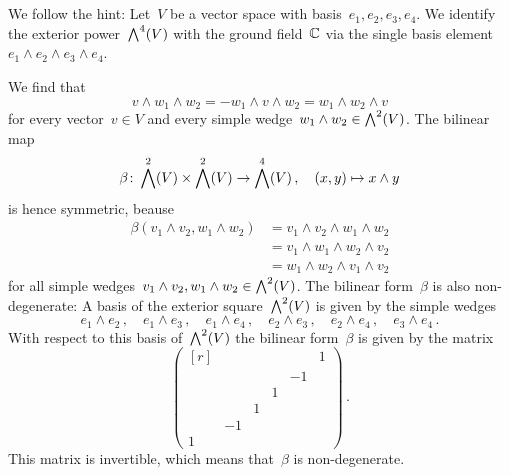 \section{}





\addtocounter{subsection}{1}





\addtocounter{subsection}{1}





\subsection{}

We follow the hint:
Let~$V$ be a {\fourdimensional} vector space with basis~$e_1, e_2, e_3, e_4$.
We identify the exterior power~$\exterior[4]{V}$ with the ground field~$\mathbb{C}$ via the single basis element~$e_1 \wedge e_2 \wedge e_3 \wedge e_4$.

We find that
\[
  v \wedge w_1 \wedge w_2
  =
  - w_1 \wedge v \wedge w_2
  =
  w_1 \wedge w_2 \wedge v
\]
for every vector~$v \in V$ and every simple wedge~$w_1 \wedge w_2 \in \exterior[2]{V}$.
The bilinear map
\[
  \beta
  \colon
  \exterior[2]{V}
  \times
  \exterior[2]{V}
  \to
  \exterior[4]{V} \,,
  \quad
  (x,y)
  \mapsto
  x \wedge y
\]
is hence symmetric, beause
\begin{align*}
  \beta(v_1 \wedge v_2, w_1 \wedge w_2)
  &=
  v_1 \wedge v_2 \wedge w_1 \wedge w_2
  \\
  &=
  v_1 \wedge w_1 \wedge w_2 \wedge v_2
  \\
  &=
  w_1 \wedge w_2 \wedge v_1 \wedge v_2
\end{align*}
for all simple wedges~$v_1 \wedge v_2, w_1 \wedge w_2 \in \exterior[2]{V}$.
The bilinear form~$\beta$ is also non-degenerate:
A basis of the exterior square~$\exterior[2]{V}$ is given by the simple wedges
\[
  e_1 \wedge e_2  \,,
  \quad
  e_1 \wedge e_3  \,,
  \quad
  e_1 \wedge e_4  \,,
  \quad
  e_2 \wedge e_3  \,,
  \quad
  e_2 \wedge e_4  \,,
  \quad
  e_3 \wedge e_4  \,.
\]
With respect to this basis of~$\exterior[2]{V}$ the bilinear form~$\beta$ is given by the matrix
\[
  \begin{pmatrix*}[r]
      &     &   &   &     & 1 \\
      &     &   &   & -1  &   \\
      &     &   & 1 &     &   \\
      &     & 1 &   &     &   \\
      & -1  &   &   &     &   \\
    1 &     &   &   &     &  
  \end{pmatrix*}  \,.
\]
This matrix is invertible, which means that~$\beta$ is non-degenerate.

